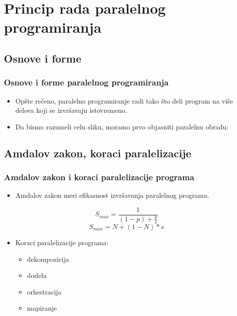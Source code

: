 \documentclass{beamer}
\begin{document}
	\section{Princip rada paralelnog programiranja}
	\subsection{Osnove i forme}
	\begin{frame}[fragile]\frametitle{Osnove i forme paralelnog programiranja}
		\begin{itemize}	
			\item Opšte rečeno, paralelno programiranje radi tako što deli program na više delova koji se izvršavaju istovremeno.			
			\item Da bismo razumeli celu sliku, moramo prvo objasniti paralelnu obradu:
		\end{itemize}
	\end{frame}

	\subsection{Amdalov zakon, koraci paralelizacije}
	\begin{frame}[fragile]\frametitle{Amdalov zakon i koraci paralelizacije programa}
	\begin{itemize}	
		\item Amdalov zakon meri efikasnost izvršavanja paralelnog programa.
	\end{itemize}
	\begin{multicols}{2}
		\begin{equation}
			S_{max} = \frac{1}{(1 - p) + \frac{p}{s}}
		\end{equation}\break
		\begin{equation}
			S_{max} = N + (1 - N) * s
		\end{equation}
	\end{multicols}
	\bigskip
	\begin{itemize}	
		\item Koraci paralelizacije programa:
		\begin{itemize}	
			\item dekompozicija
			\item dodela
			\item orkestracija
			\item mapiranje
		\end{itemize}
	\end{itemize}
	\end{frame}
\end{document}
